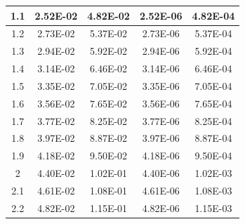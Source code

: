 \documentclass[11pt, a4paper, twocolumn]{article}
\begin{document}
\begin{longtable}[c]{|
>{\columncolor[HTML]{EFEFEF}}c |c|c|c|c|}
1.1                & 2.52E-02                               & 4.82E-02                                & 2.52E-06                               & 4.82E-04                                \\ \hline
1.2                & 2.73E-02                               & 5.37E-02                                & 2.73E-06                               & 5.37E-04                                \\ \hline
1.3                & 2.94E-02                               & 5.92E-02                                & 2.94E-06                               & 5.92E-04                                \\ \hline
1.4                & 3.14E-02                               & 6.46E-02                                & 3.14E-06                               & 6.46E-04                                \\ \hline
1.5                & 3.35E-02                               & 7.05E-02                                & 3.35E-06                               & 7.05E-04                                \\ \hline
1.6                & 3.56E-02                               & 7.65E-02                                & 3.56E-06                               & 7.65E-04                                \\ \hline
1.7                & 3.77E-02                               & 8.25E-02                                & 3.77E-06                               & 8.25E-04                                \\ \hline
1.8                & 3.97E-02                               & 8.87E-02                                & 3.97E-06                               & 8.87E-04                                \\ \hline
1.9                & 4.18E-02                               & 9.50E-02                                & 4.18E-06                               & 9.50E-04                                \\ \hline
2                  & 4.40E-02                               & 1.02E-01                                & 4.40E-06                               & 1.02E-03                                \\ \hline
2.1                & 4.61E-02                               & 1.08E-01                                & 4.61E-06                               & 1.08E-03                                \\ \hline
2.2                & 4.82E-02                               & 1.15E-01                                & 4.82E-06                               & 1.15E-03                                \\ \hline

\end{longtable}
\end{document}
